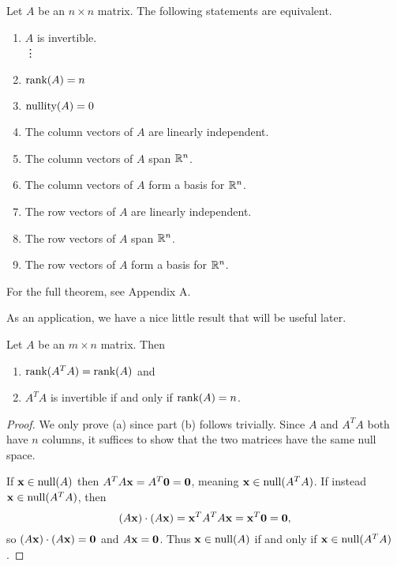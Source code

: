 \documentclass[../m073main.tex]{subfiles}
\begin{document}
\begin{theorem}
	Let $A$ be an $n\times n$ matrix.
	The following statements are equivalent.
	\begin{multicols}{2}
		\begin{enumerate}[label=(\alph*)]
			\item $A$ is invertible. \\
			\phantom{~}\hspace{-19.5pt} \vdots
			\setcounter{enumi}{5}		
			\item $\textrm{rank}(A) = n$
			\item $\textrm{nullity}(A) = 0$
			\item The column vectors of $A$ are linearly independent.
			\item The column vectors of $A$ span $\mathbb{R}^n$.
			\item The column vectors of $A$ form a basis for $\mathbb{R}^n$.
			\item The row vectors of $A$ are linearly independent.
			\item The row vectors of $A$ span $\mathbb{R}^n$.
			\item The row vectors of $A$ form a basis for $\mathbb{R}^n$.
		\end{enumerate}
	\end{multicols}
	For the full theorem, see Appendix A.
\end{theorem}

As an application, we have a nice little result that will be useful later.

\begin{theorem}
	Let $A$ be an $m\times n$ matrix.
	Then
	\begin{enumerate}[label=(\alph*)]
		\item $\textrm{rank}(A^TA) = \textrm{rank}(A)$ and
		\item $A^TA$ is invertible if and only if $\textrm{rank}(A) = n$.
	\end{enumerate}
\end{theorem}

\begin{proof}
	We only prove (a) since part (b) follows trivially.
	Since $A$ and $A^TA$ both have $n$ columns, it suffices to show that the two matrices have the same null space.

	If $\mathbf{x} \in \textrm{null}(A)$ then $A^T A \mathbf{x} = A^T \mathbf{0} = \mathbf{0}$, meaning $\mathbf{x} \in \textrm{null} (A^TA)$.
	If instead $\mathbf{x} \in \textrm{null} (A^T A)$, then
	\[ (A \mathbf{x}) \cdot (A \mathbf{x}) = \mathbf{x}^T A^T A \mathbf{x} = \mathbf{x}^T \mathbf{0} = \mathbf{0}, \]
	so $(A \mathbf{x}) \cdot (A \mathbf{x}) = \mathbf{0}$ and $A \mathbf{x} = \mathbf{0}$.
	Thus $\mathbf{x} \in \textrm{null}(A)$ if and only if $\mathbf{x} \in \textrm{null}(A^T A)$.
\end{proof}
\end{document}

